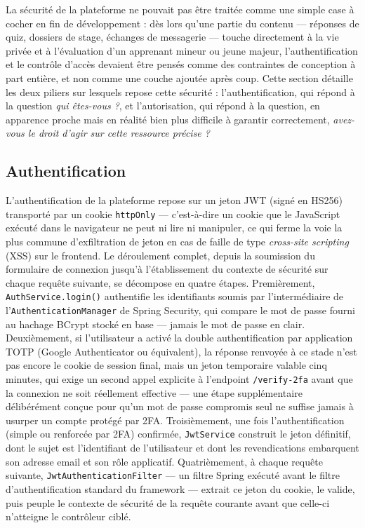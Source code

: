 La sécurité de la plateforme ne pouvait pas être traitée comme une simple
case à cocher en fin de développement : dès lors qu'une partie du contenu
--- réponses de quiz, dossiers de stage, échanges de messagerie --- touche
directement à la vie privée et à l'évaluation d'un apprenant mineur ou
jeune majeur, l'authentification et le contrôle d'accès devaient être
pensés comme des contraintes de conception à part entière, et non comme
une couche ajoutée après coup. Cette section détaille les deux piliers sur
lesquels repose cette sécurité : l'authentification, qui répond à la
question \emph{qui êtes-vous ?}, et l'autorisation, qui répond à la
question, en apparence proche mais en réalité bien plus difficile à
garantir correctement, \emph{avez-vous le droit d'agir sur cette
ressource précise ?}

\subsection{Authentification}

L'authentification de la plateforme repose sur un jeton JWT (signé en
HS256) transporté par un cookie \texttt{httpOnly} --- c'est-à-dire un
cookie que le JavaScript exécuté dans le navigateur ne peut ni lire ni
manipuler, ce qui ferme la voie la plus commune d'exfiltration de jeton en
cas de faille de type \emph{cross-site scripting} (XSS) sur le frontend.
Le déroulement complet, depuis la soumission du formulaire de connexion
jusqu'à l'établissement du contexte de sécurité sur chaque requête
suivante, se décompose en quatre étapes. Premièrement,
\texttt{AuthService.login()} authentifie les identifiants soumis par
l'intermédiaire de l'\texttt{AuthenticationManager} de Spring Security,
qui compare le mot de passe fourni au hachage BCrypt stocké en base ---
jamais le mot de passe en clair. Deuxièmement, si l'utilisateur a activé
la double authentification par application TOTP (Google Authenticator ou
équivalent), la réponse renvoyée à ce stade n'est pas encore le cookie de
session final, mais un jeton temporaire valable cinq minutes, qui exige un
second appel explicite à l'endpoint \texttt{/verify-2fa} avant que la
connexion ne soit réellement effective --- une étape supplémentaire
délibérément conçue pour qu'un mot de passe compromis seul ne suffise
jamais à usurper un compte protégé par 2FA. Troisièmement, une fois
l'authentification (simple ou renforcée par 2FA) confirmée,
\texttt{JwtService} construit le jeton définitif, dont le sujet est
l'identifiant de l'utilisateur et dont les revendications embarquent son
adresse email et son rôle applicatif. Quatrièmement, à chaque requête
suivante, \texttt{JwtAuthenticationFilter} --- un filtre Spring exécuté
avant le filtre d'authentification standard du framework --- extrait ce
jeton du cookie, le valide, puis peuple le contexte de sécurité de la
requête courante avant que celle-ci n'atteigne le contrôleur ciblé.

